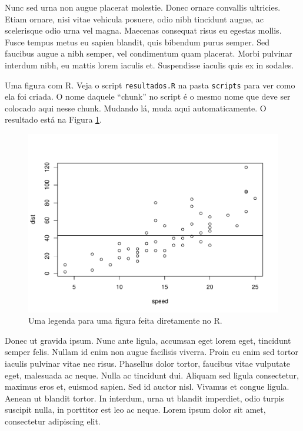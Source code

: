 \documentclass[book,A4paper,10pt,twoside,oldfontcommands]{memoir}\usepackage[]{graphicx}\usepackage[usenames,dvipsnames]{color}
\newenvironment{knitrout}{}{} %
\begin{document}
\begin{btUnit}
\begin{knitrout}
\end{knitrout}

Nunc sed urna non augue placerat molestie. Donec ornare convallis
ultricies. Etiam ornare, nisi vitae vehicula posuere, odio nibh
tincidunt augue, ac scelerisque odio urna vel magna. Maecenas
consequat risus eu egestas mollis. Fusce tempus metus eu sapien
blandit, quis bibendum purus semper. Sed faucibus augue a nibh semper,
vel condimentum quam placerat. Morbi pulvinar interdum nibh, eu mattis
lorem iaculis et. Suspendisse iaculis quis ex in sodales.

Uma figura com R. Veja o script \texttt{resultados.R} na pasta
\texttt{scripts} para ver como ela foi criada. O nome daquele ``chunk''
no script é o mesmo nome que deve ser colocado aqui nesse chunk. Mudando
lá, muda aqui automaticamente. O resultado está na Figura
\ref{fig:xyplot2}.

\begin{knitrout}
\color{fgcolor}\begin{figure}[!htb]

{\centering \includegraphics[width=0.8\linewidth]{figuras/cap02/cap02-xyplot2-1} 

}

\caption[Uma legenda para uma figura feita diretamente no R]{Uma legenda para uma figura feita diretamente no R.}\label{fig:xyplot2}
\end{figure}


\end{knitrout}

Donec ut gravida ipsum. Nunc ante ligula, accumsan eget lorem eget,
tincidunt semper felis. Nullam id enim non augue facilisis viverra.
Proin eu enim sed tortor iaculis pulvinar vitae nec risus. Phasellus
dolor tortor, faucibus vitae vulputate eget, malesuada ac neque. Nulla
ac tincidunt dui. Aliquam sed ligula consectetur, maximus eros et,
euismod sapien. Sed id auctor nisl. Vivamus et congue ligula. Aenean
ut blandit tortor. In interdum, urna ut blandit imperdiet, odio turpis
suscipit nulla, in porttitor est leo ac neque. Lorem ipsum dolor sit
amet, consectetur adipiscing elit.


\end{btUnit}
\end{document}
